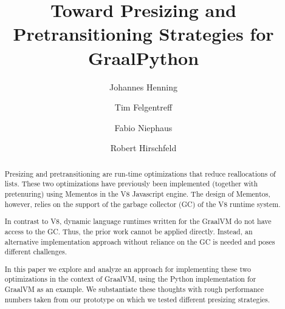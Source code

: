 \documentclass[sigconf, review, balance=false]{acmart}
\begin{document}
\lstset{
	language=Python,
	basicstyle=\ttfamily\footnotesize,
	keywordstyle=\bfseries,
	captionpos=b,
	xleftmargin=0pt,
	frame=lines,
	aboveskip=0pt,
}

\title{Toward Presizing and Pretransitioning Strategies for GraalPython}

\author{Johannes Henning}

\author{Tim Felgentreff}

\author{Fabio Niephaus}

\author{Robert Hirschfeld}

\renewcommand{\shortauthors}{Henning, Felgentreff, Niephaus, and Hirschfeld}

\begin{abstract}
Presizing and pretransitioning are run-time optimizations that reduce
reallocations of lists. These two optimizations have previously been
implemented (together with pretenuring) using Mementos in the V8
Javascript engine. The design of Mementos, however, relies on the
support of the garbage collector (GC) of the V8 runtime system.

In contrast to V8, dynamic language runtimes written for the GraalVM
do not have access to the GC. Thus, the prior work cannot be
applied directly. Instead, an alternative implementation approach without
reliance on the GC is needed and poses different challenges.

In this paper we explore and analyze an approach for implementing these two
optimizations in the context of GraalVM, using the Python
implementation for GraalVM as an example. We substantiate these
thoughts with rough performance numbers taken from our prototype on
which we tested different presizing strategies.
\end{abstract}
\end{document}
